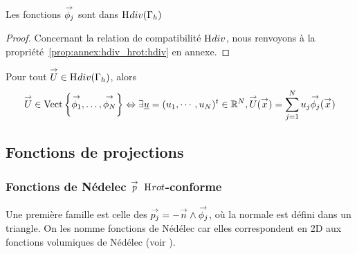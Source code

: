       \begin{prop}
        Les fonctions \({\overset{\rightarrow}{\phi_j}}\) sont dans \(\mathrm{H}_\mathrm{{}}{div}(\Gamma_h)\)
      \end{prop}
      \begin{proof}
        Concernant la relation de compatibilité \(\mathrm{H}_\mathrm{{}}{div}\), nous renvoyons à la propriété~\ref{prop:annex:hdiv_hrot:hdiv} en annexe.
      \end{proof}

      \begin{defn}
        Pour tout \({\overset{\rightarrow}{U}} \in \mathrm{H}_\mathrm{{}}{div}(\Gamma_h)\), alors
        \begin{equation*}
          {\overset{\rightarrow}{U}} \in \operatorname{Vect}\left\lbrace{\overset{\rightarrow}{\phi_1}},\ldots,{\overset{\rightarrow}{\phi_N}}\right\rbrace \Leftrightarrow \exists {\underline{u}} = (u_1,\cdots,u_N)^t \in \mathbb R^N, {\overset{\rightarrow}{U}}({\overset{\rightarrow}{x}}) = \sum_{j=1}^N u_j {\overset{\rightarrow}{\phi_j}}({\overset{\rightarrow}{x}})
        \end{equation*}
      \end{defn}

  \subsection{Fonctions de projections}


    \subsubsection[Fonctions de Nédélec p Hrot-conforme]{Fonctions de Nédelec \({\overset{\rightarrow}{p}}\) \(\mathrm{H}_\mathrm{{}}{rot}\)-conforme}

      Une première famille est celle des \({\overset{\rightarrow}{p_j}}=-{\overset{\rightarrow}{n}}\wedge{\overset{\rightarrow}{\phi_j}}\), où la normale est défini dans un triangle. On les nomme fonctions de Nédélec car elles correspondent en 2D aux fonctions volumiques de Nédélec (voir \cite{nedelec_mixed_1980}).

